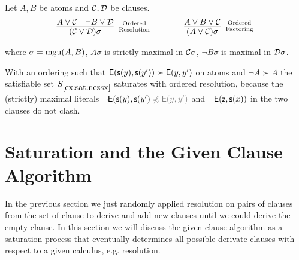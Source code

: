 \begin{definition} Let $A, B$ be atoms and ${\mathcal C},{\mathcal D}$ be clauses.
	\begin{gather*}
	\infer
	[\text{Ordered}\atop\text{Resolution}] 
	{(\mcC\lor\mcD)\sigma}
	{A\lor\mcC&\lnot B\lor\mcD}
	\qquad\qquad
	\infer
	[\text{Ordered}\atop\text{Factoring}] 
	{(A\lor\mcC)\sigma}
	{A\lor B\lor\mcC}
	\end{gather*}
	\begin{center}
		where $\sigma=\operatorname{mgu}(A,B)$, 
		$A\sigma$ is strictly maximal in ${\mathcal C}\sigma$, 
		$\lnot B\sigma$ is maximal in ${\mathcal D}\sigma$.
	\end{center}
\end{definition}

\begin{example}
	With an ordering such that ${\mathsf{E}}({\mathsf s}(y),{\mathsf s}(y')) \succ {\mathsf{E}}(y,y')$ on atoms and ${\lnot A} \succ A$
	the satisfiable set $S_{\ref{ex:sat:nezsx}}$ saturates with ordered resolution,
	because the (strictly) maximal literals 
	$\lnot \mE(\msucc(y),\msucc(y') \colG\not\preccurlyeq \mE(y,y') $
	and $\lnot{\mathsf{E}}({\mathsf z},{\mathsf s}(x))$
	in the two clauses do not clash.
\end{example}

\section{Saturation and the Given Clause Algorithm}

In the previous section we just randomly applied resolution 
on pairs of clauses from the set of clause 
to derive and add new clauses 
until we could derive the empty clause.
In this section we will discuss the given clause algorithm 
as a saturation process that eventually determines all possible derivate clauses
with respect to a given calculus, e.g. resolution.



